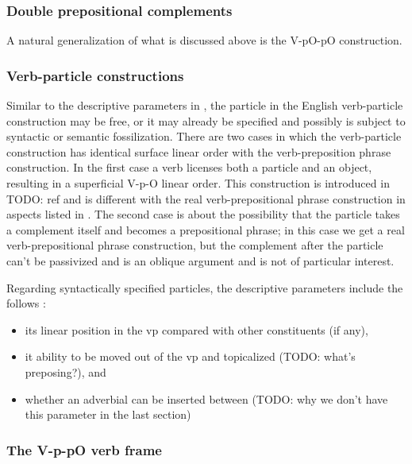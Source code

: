\documentclass[UTF8, a4paper, oneside, scheme=plain, 12pt]{ctexbook}
\newcommand*{\citesec}[1]{\S~{#1}}
\newcommand*{\citechap}[1]{Ch~{#1}}
\begin{document}
\subsubsection{Double prepositional complements}

A natural generalization of what is discussed above is 
the V-pO-pO construction.

\subsubsection{Verb-particle constructions}\label{sec:vp.valence.verb-particle}

Similar to the descriptive parameters in ,
the particle in the English verb-particle construction
may be free, 
or it may already be specified 
and possibly is subject to syntactic or semantic fossilization. 
There are two cases in which the verb-particle construction 
has identical surface linear order 
with the verb-preposition phrase construction.
In the first case a verb licenses both a particle and an object,
resulting in a superficial V-p-O linear order. 
This construction is introduced in TODO: ref
and is different with the real verb-prepositional phrase construction
in aspects listed in \citet[\citechap{4}, \citesec{6.2}]{cgel}.
The second case is about the possibility that the particle takes a complement itself 
and becomes a prepositional phrase;
in this case we get a real verb-prepositional phrase construction,
but the complement after the particle can't be passivized
and is an oblique argument and is not of particular interest.

Regarding syntactically specified particles, 
the descriptive parameters include the follows \citep[\citechap{4}, \citesec{6.3}]{cgel}:
\begin{itemize}
    \item its linear position in the \acs{vp} compared with other constituents (if any),
    \item it ability to be moved out of the \acs{vp}
        and topicalized (TODO: what's preposing?), and 
    \item whether an adverbial can be inserted between  (TODO: why we don't have this parameter in the last section) 
\end{itemize}

\subsubsection{The V-p-pO verb frame}
\end{document}
